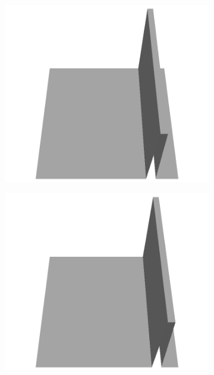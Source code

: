 \documentclass[../document.tex]{subfiles}
\begin{document}
\begin{figure}[H]
\begin{subfigure}[b]{0.160\textwidth}
    \includegraphics[width=\linewidth]{../img/5/custom_patches/walls_front/all/25-3d.png}
    \end{subfigure}
    \begin{subfigure}[b]{0.160\textwidth}
    \includegraphics[width=\linewidth]{../img/5/custom_patches/walls_front/all/20-3d.png}
    \end{subfigure}
    \begin{subfigure}[b]{0.160\textwidth}

\end{subfigure}
\end{figure}
\end{document}
